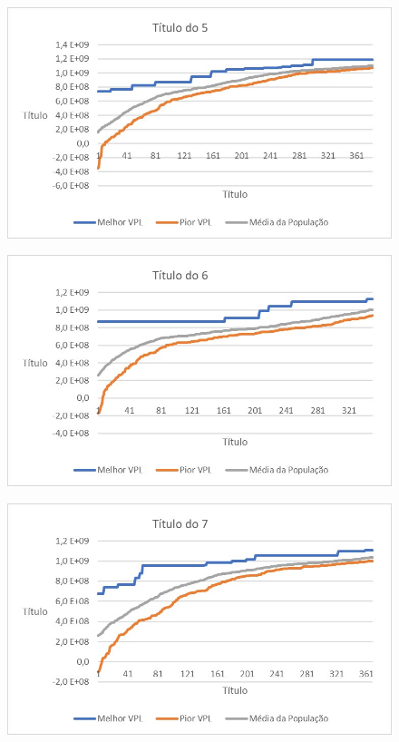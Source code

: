 \documentclass[12pt,a4paper]{report}
\begin{document}
\begin{figure}[H]
\centering

\includegraphics[scale=1]{AGRPCO2/5}

\end{figure}

\begin{figure}[H]
\centering

\includegraphics[scale=1]{AGRPCO2/6}

\end{figure}

\begin{figure}[H]
\centering

\includegraphics[scale=1]{AGRPCO2/7}

\end{figure}
\end{document}
